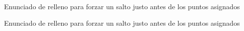 \documentclass{emate-ucr}
\begin{document}
\imprimirtitulo

\begin{ejercicio}[3]
\begin{minipage}[t]{2.5cm}
Enunciado de relleno para forzar un salto justo antes de los puntos asignados 
\end{minipage}
\end{ejercicio}

\begin{ejercicio}[1]
\begin{minipage}[t]{2.5cm}
Enunciado de relleno para forzar un salto justo antes de los puntos asignados 
\end{minipage}
\end{ejercicio}
\end{document}
